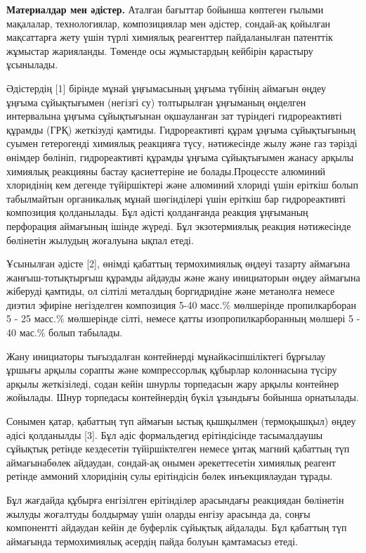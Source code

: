 \begin{multicols}{2}
{\bfseries Материалдар мен әдістер.} Аталған бағыттар бойынша көптеген
ғылыми мақалалар, технологиялар, композициялар мен әдістер, сондай-ақ
қойылған мақсаттарға жету үшін түрлі химиялық реагенттер пайдаланылған
патенттік жұмыстар жарияланды. Төменде осы жұмыстардың кейбірін
қарастыру ұсынылады.

Әдістердің {[}1{]} бірінде мұнай ұңғымасының ұңғыма түбінің аймағын
өңдеу ұңғыма сұйықтығымен (негізгі су) толтырылған ұңғыманың өңделген
интервалына ұңғыма сұйықтығынан оқшауланған зат түріндегі гидрореактивті
құрамды (ГРҚ) жеткізуді қамтиды. Гидрореактивті құрам ұңғыма
сұйықтығының суымен гетерогенді химиялық реакцияға түсу, нәтижесінде
жылу және газ тәрізді өнімдер бөлініп, гидрореактивті құрамды ұңғыма
сұйықтығымен жанасу арқылы химиялық реакцияны бастау қасиеттеріне ие
болады.Процессте алюминий хлоридінің кем дегенде түйіршіктері және
алюминий хлориді үшін еріткіш болып табылмайтын органикалық мұнай
шөгінділері үшін еріткіш бар гидрореактивті композиция қолданылады. Бұл
әдісті қолданғанда реакция ұңғыманың перфорация аймағының ішінде жүреді.
Бұл экзотермиялық реакция нәтижесінде бөлінетін жылудың жоғалуына ықпал
етеді.

Ұсынылған әдісте {[}2{]}, өнімді қабаттың термохимиялық өңдеуі тазарту
аймағына жанғыш-тотықтырғыш құрамды айдауды және жану инициаторын өңдеу
аймағына жіберуді қамтиды, ол сілтілі металдың боргидридіне және
метанолға немесе диэтил эфиріне негізделген композиция 5-40 масс.\%
мөлшерінде пропилкарборан 5 - 25 масс.\% мөлшерінде сілті, немесе қатты
изопропилкарборанның мөлшері 5 - 40 мас.\% болып табылады.

Жану инициаторы тығыздалған контейнерді мұнайкәсіпшіліктегі бұрғылау
ұршығы арқылы сорапты және компрессорлық құбырлар колоннасына түсіру
арқылы жеткізіледі, содан кейін шнурлы торпедасын жару арқылы контейнер
жойылады. Шнур торпедасы контейнердің бүкіл ұзындығы бойынша орнатылады.

Сонымен қатар, қабаттың түп аймағын ыстық қышқылмен (термоқышқыл) өңдеу
әдісі қолданылды {[}3{]}. Бұл әдіс формальдегид ерітіндісінде
тасымалдаушы сұйықтық ретінде кездесетін түйіршіктелген немесе ұнтақ
магний қабаттың түп аймағынабөлек айдаудан, сондай-ақ онымен
әрекеттесетін химиялық реагент ретінде аммоний хлоридінің сулы
ерітіндісін бөлек инъекциялаудан тұрады.

Бұл жағдайда құбырға енгізілген ерітінділер арасындағы реакциядан
бөлінетін жылуды жоғалтуды болдырмау үшін оларды енгізу арасында да,
соңғы компонентті айдаудан кейін де буферлік сұйықтық айдалады. Бұл
қабаттың түп аймағында термохимиялық әсердің пайда болуын қамтамасыз
етеді.


\end{multicols}
